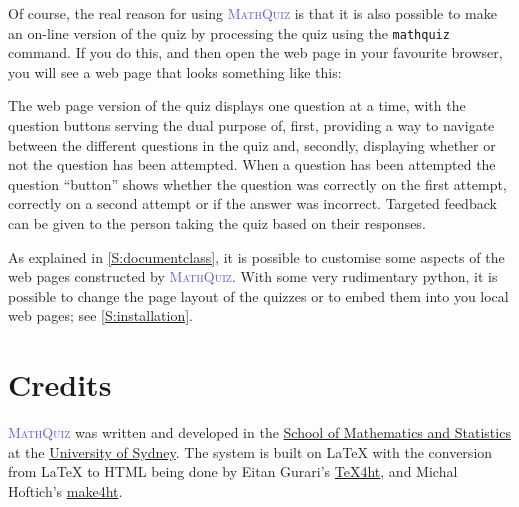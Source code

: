 \documentclass[svgnames]{article}
\def\MathQuiz{\textcolor{SlateBlue}{\textsc{MathQuiz}}\xspace}
\begin{document}
    Of course, the real reason for using \MathQuiz is that it is also
    possible to make an on-line version of the quiz by processing the
    quiz using the \texttt{mathquiz} command. If you do this, and then open
    the web page in your favourite browser, you will see a web page
    that looks something like this:

    \begin{center}
    \end{center}

    The web page version of the quiz displays one question at a time,
    with the question buttons serving the dual purpose of, first,
    providing a way to navigate between the different questions in the
    quiz and, secondly, displaying whether or not the question has been
    attempted. When a question has been attempted the question
    ``button'' shows whether the question was correctly on the first
    attempt, correctly on a second attempt or if the answer was
    incorrect. Targeted feedback can be given to the person taking the
    quiz based on their responses.

    As explained in \autoref{S:documentclass}, it is possible to
    customise some aspects of the web pages constructed by \MathQuiz.
    With some very rudimentary python, it is possible to change the page
    layout of the quizzes or to embed them into you local web pages; see
    \autoref{S:installation}.

\section{Credits}
    \MathQuiz{} was written and developed in the
    \href{http://www.maths.usyd.edu.au/}{School of Mathematics and
    Statistics} at the \href{http://www.usyd.edu.au/}{University of
    Sydney}.  The system is built on \LaTeX{} with the conversion from
    \LaTeX{} to HTML being done by Eitan Gurari's
    \href{http://www.cis.ohio-state.edu/~gurari/TeX4ht/mn.html}{TeX4ht},
    and Michal Hoftich's
    \href{https://github.com/michal-h21/make4ht}{make4ht}.
\end{document}
